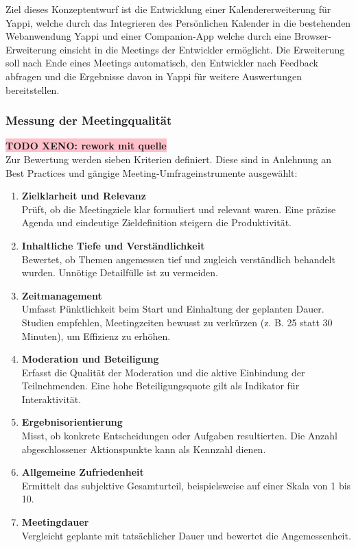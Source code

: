 \documentclass[12pt,a4paper]{report}
\newcommand{\xeno}[1]{\colorbox{pink}{\textbf{TODO XENO: #1}}\\}
\begin{document}
Ziel dieses Konzeptentwurf ist die Entwicklung einer Kalendererweiterung für Yappi, welche durch das Integrieren des Persönlichen Kalender
in die bestehenden Webanwendung Yappi und einer Companion-App welche durch eine Browser-Erweiterung einsicht in die Meetings der Entwickler ermöglicht.
Die Erweiterung soll nach Ende eines Meetings automatisch, den Entwickler nach Feedback abfragen und die Ergebnisse davon in Yappi für weitere Auswertungen bereitstellen.

\subsubsection{Messung der Meetingqualität}
\xeno{rework mit quelle}
Zur Bewertung werden sieben Kriterien definiert. Diese sind in Anlehnung an Best Practices und gängige Meeting-Umfrageinstrumente ausgewählt:

\begin{enumerate}
    \item \textbf{Zielklarheit und Relevanz} \\
    Prüft, ob die Meetingziele klar formuliert und relevant waren. Eine präzise Agenda und eindeutige Zieldefinition steigern die Produktivität.

    \item \textbf{Inhaltliche Tiefe und Verständlichkeit} \\
    Bewertet, ob Themen angemessen tief und zugleich verständlich behandelt wurden. Unnötige Detailfülle ist zu vermeiden.

    \item \textbf{Zeitmanagement} \\
    Umfasst Pünktlichkeit beim Start und Einhaltung der geplanten Dauer. Studien empfehlen, Meetingzeiten bewusst zu verkürzen (z. B. 25 statt 30 Minuten), um Effizienz zu erhöhen.

    \item \textbf{Moderation und Beteiligung} \\
    Erfasst die Qualität der Moderation und die aktive Einbindung der Teilnehmenden. Eine hohe Beteiligungsquote gilt als Indikator für Interaktivität.

    \item \textbf{Ergebnisorientierung} \\
    Misst, ob konkrete Entscheidungen oder Aufgaben resultierten. Die Anzahl abgeschlossener Aktionspunkte kann als Kennzahl dienen.

    \item \textbf{Allgemeine Zufriedenheit} \\
    Ermittelt das subjektive Gesamturteil, beispielsweise auf einer Skala von 1 bis 10.

    \item \textbf{Meetingdauer} \\
    Vergleicht geplante mit tatsächlicher Dauer und bewertet die Angemessenheit.
\end{enumerate}
\end{document}
